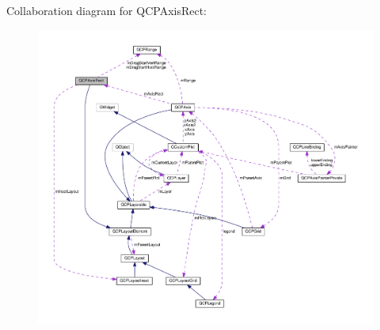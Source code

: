 Collaboration diagram for Q\+C\+P\+Axis\+Rect\+:\nopagebreak
\begin{figure}[H]
\begin{center}
\leavevmode
\includegraphics[width=350pt]{classQCPAxisRect__coll__graph}
\end{center}
\end{figure}
